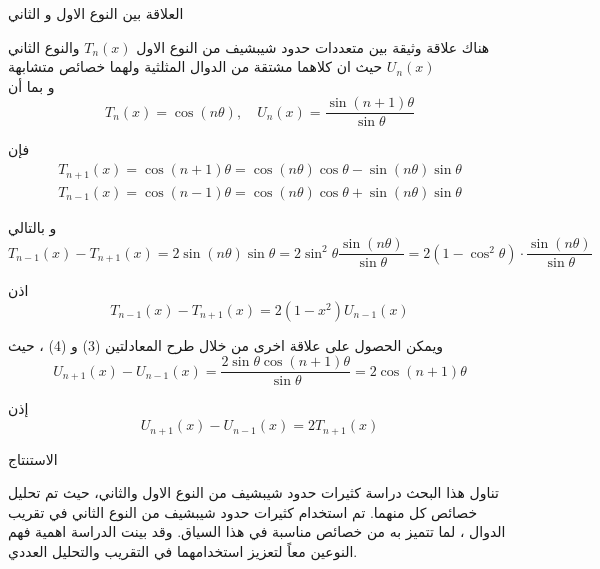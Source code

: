	\begin{frame}{العلاقة بين النوع الاول و الثاني}

\pause
\noindent
هناك علاقة وثيقة بين متعددات حدود شيبشيف من النوع الاول  $T_n(x)$ والنوع الثاني $U_n(x)$ حيث ان كلاهما مشتقة من الدوال المثلثية ولهما خصائص متشابهة\\

\pause
 و بما أن
 \[
 T_n(x) = \cos(n \theta), \quad U_n(x) = \frac{\sin(n+1)\theta}{\sin\theta}
 \]
 
 \pause
 فإن
 \begin{align}
 	T_{n+1}(x) = \cos(n+1)\theta = \cos(n\theta)\cos\theta - \sin(n\theta)\sin\theta \\
 T_{n-1}(x) = \cos(n-1)\theta = \cos(n\theta)\cos\theta + \sin(n\theta)\sin\theta 
 \end{align}
 
 \pause
 و بالتالي
 \[
 T_{n-1}(x) - T_{n+1}(x) = 2 \sin(n\theta) \sin\theta = 2 \sin^2\theta \frac{\sin(n\theta)}{\sin\theta} = 2(1-\cos^2 \theta)\cdot\frac{\sin(n\theta)}{\sin \theta}
 \]
	\end{frame}
	
\begin{frame}
	
	\pause
		اذن
		\begin{equation}
		T_{n-1}(x) - T_{n+1}(x) = 2 (1-x^2) U_{n-1}(x) 
	\end{equation}
	
	\pause
	ويمكن الحصول على علاقة اخرى من خلال طرح المعادلتين (3) و (4) ، حيث
	\[
	U_{n+1}(x) - U_{n-1}(x) = \frac{2\sin\theta\cos(n+1)\theta}{\sin\theta} = 2 \cos(n+1)\theta
	\]
	
	\pause
	إذن 
	\begin{equation}
		U_{n+1}(x) - U_{n-1}(x)  = 2T_{n+1}(x)
	\end{equation}
\end{frame}

\begin{frame}{الاستنتاج}
	
	\pause
	تناول هذا البحث دراسة كثيرات حدود شيبشيف من النوع الاول والثاني، حيث تم تحليل خصائص كل منهما. تم استخدام كثيرات حدود شيبشيف من النوع الثاني في تقريب الدوال ، لما تتميز به من خصائص مناسبة في هذا السياق. وقد بينت الدراسة اهمية فهم النوعين معاً لتعزيز استخدامهما في التقريب والتحليل العددي.
\end{frame}

